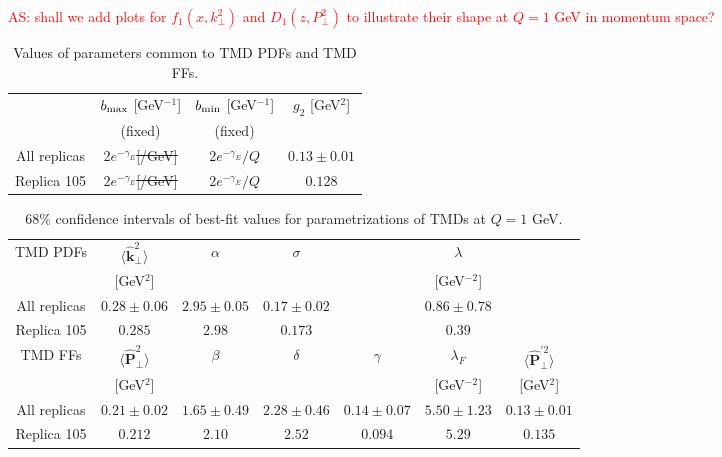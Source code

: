 \documentclass[aps,preprintnumbers,showpacs,nofootinbib,superscriptaddress,floatfix]{revtex4}
\newcommand{\AS}[1]{{\textcolor[rgb]{1,0,1}{#1}}}
\newcommand{\T}{\perp}
\newcommand{\bb}{b}
\begin{document}
\textcolor{red}{AS: shall we add plots for $f_1(x,k_\perp^2)$ and $D_1(z,P_\perp^2)$ to illustrate their shape at $Q=1$ GeV in momentum space?}
\begin{table}[h!]
\small
  \centering
  \begin{tabular}{|c|c|c|c|}
\hline
\hline
&$\bb_{\rm max}$ [GeV$^{-1}$] & $\bb_{\rm min}$ [GeV$^{-1}$] &  $g_2$ {[GeV$^2$]} 
 \\ 
& (fixed)     & (fixed)   &                            \\
\hline
All replicas & $2 e^{-\gamma_E}$\AS{\sout{[/GeV]}}& $2 e^{-\gamma_E}/Q$  & $0.13 \pm 0.01$  \\
\hline
Replica 105 &  $2 e^{-\gamma_E}$\AS{\sout{[/GeV]}}& $2 e^{-\gamma_E}/Q$  & $0.128$  \\
\hline
\hline
\end{tabular}
\caption{Values of parameters common to TMD PDFs and TMD FFs.}
\label{t:fl_ind_parcommon}
\end{table}
\begin{table}[h!]
\small
  \centering
  \begin{tabular}{|c||c|c|c|c|c|c|}
\hline
\hline
TMD PDFs&  $\big \langle \hat{\bm{k}}_{\T}^2 \big \rangle$ 
& $\alpha$ & $\sigma$ & & $\lambda$ &  
 \\ 
        & {[GeV$^2$]}                               &
       &      &  &{[GeV$^{-2}$]} & \\
\hline
All replicas &  $0.28\pm 0.06$ & $2.95\pm 0.05$ & $0.17\pm 0.02$ & 
                & $0.86\pm 0.78$ & 
\\
\hline
Replica 105  &  $0.285$ & $2.98$ & $0.173$ & & $0.39$ & \\
\hline
\hline
TMD FFs&  $\big \langle \hat{\bm{P}}_{\perp}^2 \big \rangle$ &
$\beta$ & $\delta$ & $\gamma$ & $\lambda_F$ & $\big \langle
\hat{\bm{P}}_{\perp}^{\prime 2} \big \rangle$
 \\ 
        & {[GeV$^2$]} &            &        & &{[GeV$^{-2}$]} &{[GeV$^2$]}    \\
\hline
All replicas & $0.21\pm 0.02$ & $1.65\pm 0.49$ & $2.28\pm 0.46$ & $0.14\pm 0.07$ &
$5.50\pm 1.23$ & $0.13\pm 0.01$ \\
\hline
Replica 105   &  
 $0.212$ & $2.10$ & $2.52$ & $0.094$ & $5.29$ & $0.135$ \\
\hline
\hline
\end{tabular}
\caption{68\% confidence intervals of best-fit values for parametrizations of TMDs at $Q=1$ GeV.}
\label{t:fl_ind_par_TMD}
\end{table}
\end{document}
